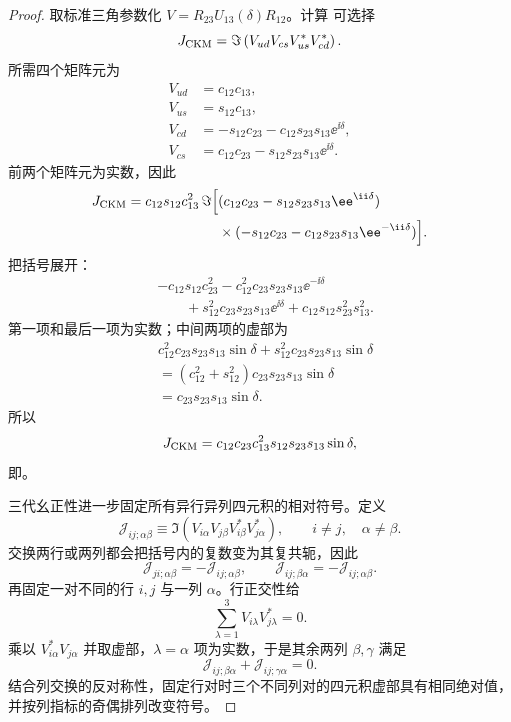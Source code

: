 \begin{proof}
取标准三角参数化 $V=R_{23}U_{13}(\delta)R_{12}$。计算 可选择
\begin{equation*}
 J_{\rm CKM}
 =\Im\left(V_{ud}V_{cs}V_{us}^*V_{cd}^*\right).
\end{equation*}
所需四个矩阵元为
\begin{align*}
 V_{ud}&=c_{12}c_{13},\\
 V_{us}&=s_{12}c_{13},\\
 V_{cd}&=-s_{12}c_{23}-c_{12}s_{23}s_{13}\ee^{\ii\delta},\\
 V_{cs}&=c_{12}c_{23}-s_{12}s_{23}s_{13}\ee^{\ii\delta}.
\end{align*}
前两个矩阵元为实数，因此
\begin{align*}
 J_{\rm CKM}
 =c_{12}s_{12}c_{13}^2\,
 \Im\Big[&
 (c_{12}c_{23}-s_{12}s_{23}s_{13}\ee^{\ii\delta})\\
 &\times(-s_{12}c_{23}-c_{12}s_{23}s_{13}\ee^{-\ii\delta})
 \Big].
\end{align*}
把括号展开：
\begin{align*}
 {}&-c_{12}s_{12}c_{23}^2
 -c_{12}^2c_{23}s_{23}s_{13}\ee^{-\ii\delta}\\
 &\qquad
 +s_{12}^2c_{23}s_{23}s_{13}\ee^{\ii\delta}
 +c_{12}s_{12}s_{23}^2s_{13}^2.
\end{align*}
第一项和最后一项为实数；中间两项的虚部为
\begin{align*}
 &c_{12}^2c_{23}s_{23}s_{13}\sin\delta
 +s_{12}^2c_{23}s_{23}s_{13}\sin\delta\\
 &=(c_{12}^2+s_{12}^2)c_{23}s_{23}s_{13}\sin\delta\\
 &=c_{23}s_{23}s_{13}\sin\delta.
\end{align*}
所以
\begin{equation*}
 J_{\rm CKM}
 =c_{12}c_{23}c_{13}^2s_{12}s_{23}s_{13}\sin\delta,
\end{equation*}
即。

三代幺正性进一步固定所有异行异列四元积的相对符号。定义
\begin{equation*}
 \mathcal J_{ij;\alpha\beta}
 \equiv\Im\!\left(
 V_{i\alpha}V_{j\beta}V_{i\beta}^*V_{j\alpha}^*
 \right),
 \qquad i\neq j,\quad \alpha\neq\beta.
\end{equation*}
交换两行或两列都会把括号内的复数变为其复共轭，因此
\begin{equation*}
 \mathcal J_{ji;\alpha\beta}
 =-\mathcal J_{ij;\alpha\beta},
 \qquad
 \mathcal J_{ij;\beta\alpha}
 =-\mathcal J_{ij;\alpha\beta}.
\end{equation*}
再固定一对不同的行 $i,j$ 与一列 $\alpha$。行正交性给
\begin{equation*}
 \sum_{\lambda=1}^{3}V_{i\lambda}V_{j\lambda}^*=0.
\end{equation*}
乘以 $V_{i\alpha}^*V_{j\alpha}$ 并取虚部，$\lambda=\alpha$ 项为实数，于是其余两列 $\beta,\gamma$ 满足
\begin{equation*}
 \mathcal J_{ij;\beta\alpha}
 +\mathcal J_{ij;\gamma\alpha}=0.
\end{equation*}
结合列交换的反对称性，固定行对时三个不同列对的四元积虚部具有相同绝对值，并按列指标的奇偶排列改变符号。


\end{proof}
